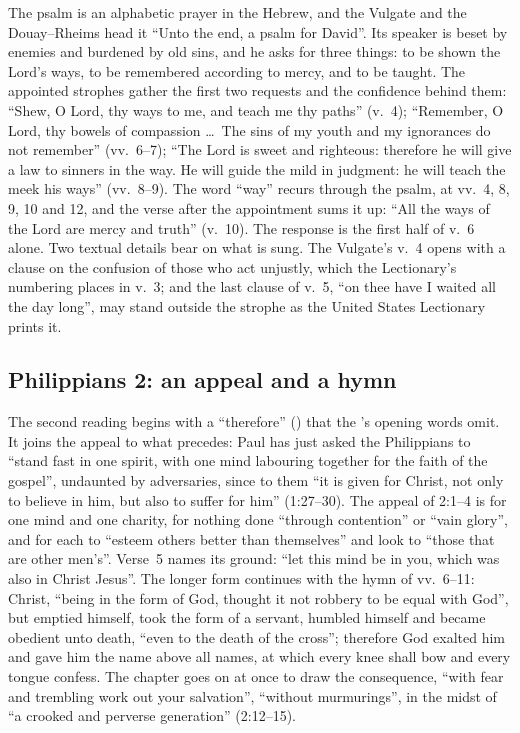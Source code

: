 The psalm is an alphabetic prayer in the Hebrew, and the Vulgate and the
Douay--Rheims head it ``Unto the end, a psalm for David''. Its speaker is beset by enemies and burdened by old sins,
and he asks for three things: to be shown the Lord's ways, to be remembered
according to mercy, and to be taught. The appointed strophes gather the first
two requests and the confidence behind them: ``Shew, O Lord, thy ways to me,
and teach me thy paths'' (v.~4); ``Remember, O Lord, thy bowels of compassion
\ldots\ The sins of my youth and my ignorances do not remember'' (vv.~6--7);
``The Lord is sweet and righteous: therefore he will give a law to sinners in
the way. He will guide the mild in judgment: he will teach the meek his ways''
(vv.~8--9). The word ``way'' recurs through the psalm, at vv.~4, 8, 9, 10 and
12, and the verse after the appointment sums it up: ``All the ways of the Lord
are mercy and truth'' (v.~10). The response is the first half of v.~6 alone.
Two textual details bear on what is sung. The Vulgate's v.~4 opens with a
clause on the confusion of those who act unjustly, which the Lectionary's
numbering places in v.~3; and the last clause of v.~5, ``on thee have I waited
all the day long'', may stand outside the strophe as the United States
Lectionary prints it.

\subsection{Philippians 2: an appeal and a hymn}

The second reading begins with a ``therefore'' () that the
's opening words omit. It joins the appeal to what precedes: Paul has
just asked the Philippians to ``stand fast in one spirit, with one mind
labouring together for the faith of the gospel'', undaunted by adversaries,
since to them ``it is given for Christ, not only to believe in him, but also to
suffer for him'' (1:27--30). The appeal of 2:1--4 is for one mind and one
charity, for nothing done ``through contention'' or ``vain glory'', and for
each to ``esteem others better than themselves'' and look to ``those that are
other men's''. Verse~5 names its ground: ``let this mind be in you, which was
also in Christ Jesus''. The longer form continues with the hymn of vv.~6--11:
Christ, ``being in the form of God, thought it not robbery to be equal with
God'', but emptied himself, took the form of a servant, humbled himself and became
obedient unto death, ``even to the death of the cross''; therefore God exalted
him and gave him the name above all names, at which every knee shall bow and
every tongue confess. The chapter goes on at once to draw the consequence,
``with fear and trembling work out your salvation'', ``without murmurings'', in
the midst of ``a crooked and perverse generation'' (2:12--15).

